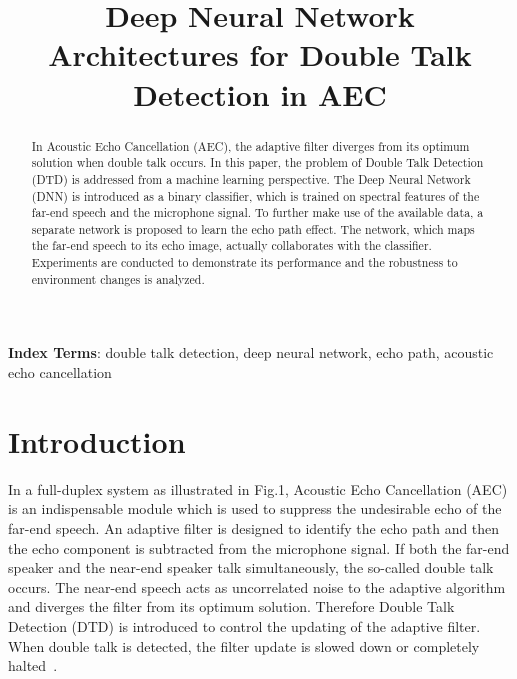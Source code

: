 \documentclass[a4paper]{article}
\title{Deep Neural Network Architectures for Double Talk Detection in AEC\\}
\begin{document}
\maketitle
%
\begin{abstract}
  In Acoustic Echo Cancellation (AEC), the adaptive filter diverges from its optimum solution when double talk occurs. In this paper, the problem of Double Talk Detection (DTD) is addressed from a machine learning perspective. The Deep Neural Network (DNN) is introduced as a binary classifier, which is trained on spectral features of the far-end speech and the microphone signal. To further make use of the available data, a separate network is proposed to learn the echo path effect. The network, which maps the far-end speech to its echo image, actually collaborates with the classifier. Experiments are conducted to demonstrate its performance and the robustness to environment changes is analyzed.
\end{abstract}
\noindent\textbf{Index Terms}: double talk detection, deep neural network, echo path, acoustic echo cancellation

\section{Introduction}

In a full-duplex system as illustrated in Fig.1, Acoustic Echo Cancellation (AEC) is an indispensable module which is used to suppress the undesirable echo of the far-end speech. An adaptive filter is designed to identify the echo path and then the echo component is subtracted from the microphone signal. If both the far-end speaker and the near-end speaker talk simultaneously, the so-called double talk occurs. The near-end speech acts as uncorrelated noise to the adaptive algorithm and diverges the filter from its optimum solution. Therefore Double Talk Detection (DTD) is introduced to control the updating of the adaptive filter. When double talk is detected, the filter update is slowed down or completely halted~\cite{benesty2011double}.
\end{document}
